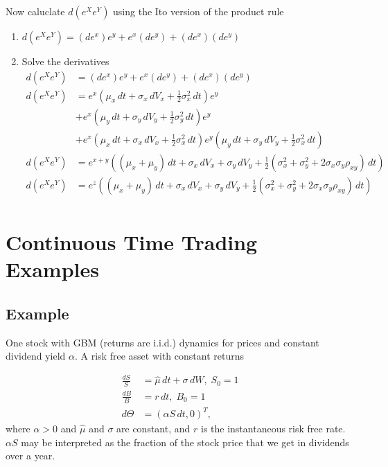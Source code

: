 \documentclass[11pt]{article}
\begin{document}
Now caluclate $d(e^X e^Y)$ using the Ito version of the product rule 
\begin{enumerate}
    \item $d(e^X e^Y) = (de^x)e^y + e^x(de^y) + (de^x)(de^y)$
    \item Solve the derivatives  %
        \begin{align*}
            d(e^X e^Y) &= (de^x)e^y + e^x(de^y) + (de^x)(de^y) \\
            d(e^X e^Y) &= e^x(\mu_x\,dt + \sigma_x\,dV_x + \frac{1}{2} \sigma_x^2 \,dt)e^y \\
            &+ e^x(\mu_y\,dt + \sigma_y\,dV_y + \frac{1}{2} \sigma_y^2 \,dt)e^y \\
            &+ e^x(\mu_x\,dt + \sigma_x\,dV_x + \frac{1}{2} \sigma_x^2 \,dt) e^y(\mu_y\,dt + 
            \sigma_y\,dV_y + \frac{1}{2} \sigma_x^2 \,dt) \\
            d(e^X e^Y) &= e^{x+y} ((\mu_x + \mu_y)\,dt + \sigma_x\,dV_x + \sigma_y\,dV_y + 
            \frac{1}{2} {(\sigma_x^2 + \sigma_y^2 + 2 \sigma_x \sigma_y \rho_{xy})} \,dt) \\
            d(e^X e^Y) &= e^{z} ((\mu_x + \mu_y)\,dt + \sigma_x\,dV_x + \sigma_y\,dV_y + 
            \frac{1}{2} {(\sigma_x^2 + \sigma_y^2 + 2 \sigma_x \sigma_y \rho_{xy})} \,dt) \\
        \end{align*} 
\end{enumerate}

\section{Continuous Time Trading Examples}
\subsection{Example}

One stock with GBM (returns are i.i.d.) dynamics for prices and constant dividend yield 
$\alpha$. A risk free asset with constant returns 

\begin{align*}
    \frac{dS}{S} &= \hat{\mu}\,dt + \sigma\,dW, \; S_0 = 1 \\
    \frac{dB}{B} &= r\,dt, \; B_0 = 1 \\ 
    d\Theta &= {(\alpha S \,dt, 0)}^T, 
\end{align*}
where $\alpha>0$ and $\hat{\mu}$ and $\sigma$ are constant, and $r$ is the instantaneous risk 
free rate. $\alpha S$ may be interpreted as the fraction of the stock price that we get in 
dividends over a year. \\
\end{document}

